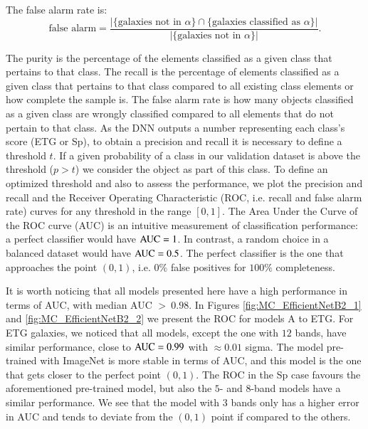 \documentclass[fleqn,usenatbib]{mnras}
\begin{document}
\noindent The false alarm rate is:
\begin{equation}
\text{false alarm}=\frac{|\{\text{galaxies not in $\alpha$}\}\cap\{\text{galaxies classified as $\alpha$}\}|}{|\{\text{galaxies not in $\alpha$}\}|}.
\end{equation}

\noindent The purity is the percentage of the elements classified as a given class that pertains to that class. The recall is the percentage of elements classified as a given class that pertains to that class compared to all existing class elements or how complete the sample is. The false alarm rate is  how many objects classified as a given class are wrongly classified compared to all elements that do not pertain to that class.
As the DNN outputs a number representing each class's score (ETG or Sp), to obtain a precision and recall it is necessary to define a threshold $t$. If a given probability of a class in our validation dataset is above the threshold ($p>t$) we consider the object as part of this class. To define an optimized threshold and also to assess the performance, we plot the precision and recall and the Receiver Operating Characteristic (ROC, i.e. recall and false alarm rate) curves for any threshold in the range $[0,1]$. The Area Under the Curve of the ROC curve (AUC) is an intuitive measurement of classification performance: a perfect classifier would have ${\rm AUC}=1$. In contrast, a random choice in a balanced dataset would have ${\rm AUC}=0.5$. The perfect classifier is the one that approaches the point $(0,1)$, i.e. $0\%$ false positives for  $100\%$ completeness.  


It is worth noticing that all models presented here have a high performance in terms of AUC, with median AUC $>~0.98$. In Figures \ref{fig:MC_EfficientNetB2_1} and \ref{fig:MC_EfficientNetB2_2} we present the ROC for models A to ETG. For ETG galaxies, we noticed that all models, except the one with $12$ bands, have similar performance, close to ${\rm AUC}=0.99$ with $\approx 0.01$ sigma. The model pre-trained with ImageNet is more stable in terms of AUC, and this model is the one that gets closer to the perfect point $(0,1)$. The ROC in the Sp case favours the aforementioned pre-trained model, but also the $5$- and $8$-band models have a similar performance. We see that the model with $3$ bands only has a higher error in AUC and tends to deviate from the $(0,1)$ point if compared to the others. 
\end{document}
